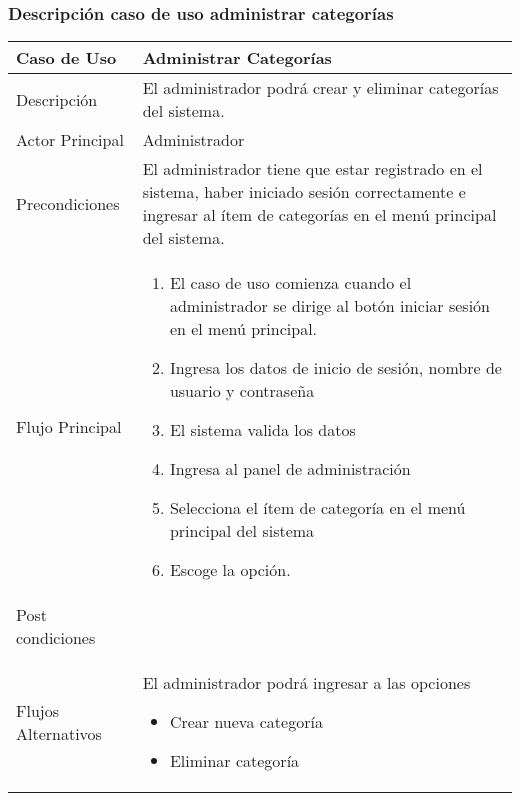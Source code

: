 \documentclass[12pt,a4paper]{article}
\begin{document}
\subsubsection*{Descripción caso de uso administrar categorías}
\begin{table}[h]
        \centering
        \begin{tabular}{| p{3cm}| p{11cm} |} 
        \hline  
        Caso de Uso         &    \textbf{Administrar Categorías }   \\ 
        \hline
        Descripción         &    El administrador podrá crear y eliminar categorías del sistema.   \\ 
        \hline
        Actor Principal     &   Administrador   \\ 
        \hline
        Precondiciones      &    El administrador tiene que estar registrado en el sistema, haber iniciado sesión correctamente e ingresar al ítem de categorías en el menú principal del sistema. 	\\
        \hline
        Flujo Principal     &    

            \begin{enumerate}
                \item El caso de uso comienza cuando el administrador se dirige al botón iniciar sesión en el menú principal.
                \item Ingresa los datos de inicio de sesión, nombre de usuario y contraseña
                \item El sistema valida los datos
                \item Ingresa al panel de administración
                \item Selecciona el ítem de categoría en el menú principal del sistema
                \item Escoge la opción.
            \end{enumerate}
        \\  
        \hline
        Post condiciones    &       \\  
        \hline
        Flujos Alternativos &  El administrador podrá ingresar a las opciones
        \begin{itemize}
            \item Crear nueva categoría
            \item Eliminar categoría
        \end{itemize}
        \\  
        \hline
        \end{tabular}
    \end{table}
\end{document}
